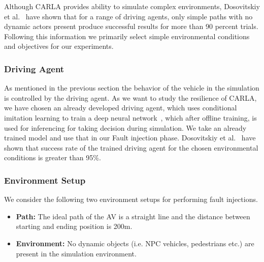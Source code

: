 Although CARLA provides ability to simulate complex environments, Dosovitskiy et al.~\cite{Dosovitskiy17} have shown that for a range of driving agents, only simple paths with no dynamic actors present produce successful results for more than 90 percent trials. Following this information we primarily select simple environmental conditions and objectives for our experiments. 

\subsubsection{Driving Agent}
As mentioned in the previous section the behavior of the vehicle in the simulation is controlled by the driving agent. As we want to study the resilience of CARLA, we have chosen an already developed driving agent, which uses conditional imitation learning to train a deep neural network~\cite{Codevilla2018}, which after offline training, is used for inferencing for taking decision during simulation. We take an already trained model and use that in our Fault injection phase. Dosovitskiy et al.~\cite{Dosovitskiy17} have shown that success rate of the trained driving agent for the chosen environmental conditions is greater than 95\%.


\subsubsection{Environment Setup}
We consider the following two environment setups for performing fault injections.

\begin{itemize}
\item \textbf{Path:} The ideal path of the AV is a straight line and the distance between starting and ending position is 200m. 

\item \textbf{Environment:} No dynamic objects (i.e. NPC vehicles, pedestrians etc.) are present in the simulation environment.
\end{itemize}